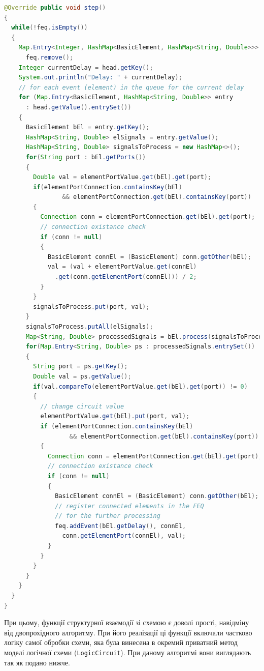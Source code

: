\documentclass[12pt,a4paper]{article}
\begin{document}
\begin{lstlisting}[language=Java]
@Override public void step()
{
  while(!feq.isEmpty())
  {
    Map.Entry<Integer, HashMap<BasicElement, HashMap<String, Double>>> head =
      feq.remove();
    Integer currentDelay = head.getKey();
    System.out.println("Delay: " + currentDelay);
    // for each event (element) in the queue for the current delay
    for (Map.Entry<BasicElement, HashMap<String, Double>> entry
      : head.getValue().entrySet())
    {
      BasicElement bEl = entry.getKey();
      HashMap<String, Double> elSignals = entry.getValue();
      HashMap<String, Double> signalsToProcess = new HashMap<>();
      for(String port : bEl.getPorts())
      {
        Double val = elementPortValue.get(bEl).get(port);
        if(elementPortConnection.containsKey(bEl)
                && elementPortConnection.get(bEl).containsKey(port))
        {
          Connection conn = elementPortConnection.get(bEl).get(port);
          // connection existance check
          if (conn != null)
          {
            BasicElement connEl = (BasicElement) conn.getOther(bEl);
            val = (val + elementPortValue.get(connEl)
              .get(conn.getElementPort(connEl))) / 2;
          }
        }
        signalsToProcess.put(port, val);
      }
      signalsToProcess.putAll(elSignals);
      Map<String, Double> processedSignals = bEl.process(signalsToProcess);
      for(Map.Entry<String, Double> ps : processedSignals.entrySet())
      {
        String port = ps.getKey();
        Double val = ps.getValue();
        if(val.compareTo(elementPortValue.get(bEl).get(port)) != 0)
        {
          // change circuit value
          elementPortValue.get(bEl).put(port, val);
          if (elementPortConnection.containsKey(bEl)
                  && elementPortConnection.get(bEl).containsKey(port))
          {
            Connection conn = elementPortConnection.get(bEl).get(port);
            // connection existance check
            if (conn != null)
            {
              BasicElement connEl = (BasicElement) conn.getOther(bEl);
              // register connected elements in the FEQ
              // for the further processing
              feq.addEvent(bEl.getDelay(), connEl,
                conn.getElementPort(connEl), val);
            }
          }
        }
      }
    }
  }
}
\end{lstlisting}

При цьому, функції структурної взаємодії зі схемою є доволі прості, навідміну від двопрохідного алгоритму. При його реалізації ці функції включали частково логіку самої обробки схеми, яка була винесена в окремий приватний метод моделі логічної схеми (\lstinline$LogicCircuit$). При даному алгоритмі вони виглядають так як подано нижче.
\end{document}
